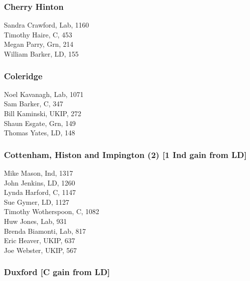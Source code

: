 \documentclass[a4paper,openany,10pt]{book}
\begin{document}
\subsubsection*{Cherry Hinton}



Sandra Crawford, Lab, 1160\\
Timothy Haire, C, 453\\
Megan Parry, Grn, 214\\
William Barker, LD, 155\\


\subsubsection*{Coleridge}



Noel Kavanagh, Lab, 1071\\
Sam Barker, C, 347\\
Bill Kaminski, UKIP, 272\\
Shaun Esgate, Grn, 149\\
Thomas Yates, LD, 148\\


\subsubsection*{Cottenham, Histon and Impington (2) \hspace*{\fill}\nolinebreak[1]%
\enspace\hspace*{\fill}
[1 Ind gain from LD]}



Mike Mason, Ind, 1317\\
John Jenkins, LD, 1260\\
Lynda Harford, C, 1147\\
Sue Gymer, LD, 1127\\
{Timothy Wotherspoon}, C, 1082\\
Huw Jones, Lab, 931\\
Brenda Biamonti, Lab, 817\\
Eric Heaver, UKIP, 637\\
Joe Webster, UKIP, 567\\


\subsubsection*{Duxford \hspace*{\fill}\nolinebreak[1]%
\enspace\hspace*{\fill}
[C gain from LD]}
\end{document}
